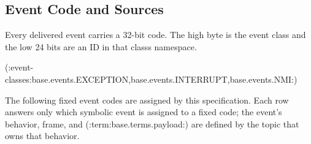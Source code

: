 \subsection{Event Code and Sources}\label{section:event-code-and-sources}
Every delivered event carries a 32-bit code. The high byte is the event class and the low 24 bits are an ID in that
class\textquotesingle{}s namespace.

(:event-classes:base.events.EXCEPTION,base.events.INTERRUPT,base.events.NMI:)

The following fixed event codes are assigned by this specification. Each row answers only which symbolic event is
assigned to a fixed code; the event's behavior, frame, and (:term:base.terms.payload:) are defined by the topic that owns that behavior.

